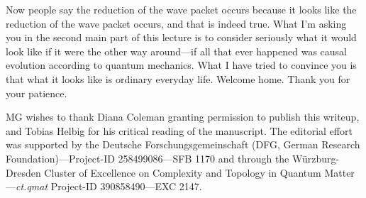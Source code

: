 \documentclass[twocolumn,prb]{revtex4}
\begin{document}

Now people say the reduction of the wave packet occurs because it looks like the reduction of the wave packet occurs, and that is indeed true. What I'm asking you in the second main part of this lecture is to consider seriously what it would look like if it were the other way around---if all that ever happened was causal evolution according to quantum mechanics. What I have tried to convince you is that what it looks like is ordinary everyday life. Welcome home. Thank you for your patience.






\vfill\eject\vfill %

\begin{acknowledgments}
MG wishes to thank Diana Coleman granting permission to publish this writeup, and Tobias Helbig for his critical reading of the manuscript.  The editorial effort %
was supported by the Deutsche Forschungsgemeinschaft (DFG, German Research Foundation)---Project-ID 258499086---SFB 1170 and through the W\"urzburg-Dresden Cluster of Excellence on Complexity and Topology in Quantum Matter---\textit{ct.qmat} Project-ID 390858490---EXC 2147.
\end{acknowledgments}



% 
% 
\end{document}
